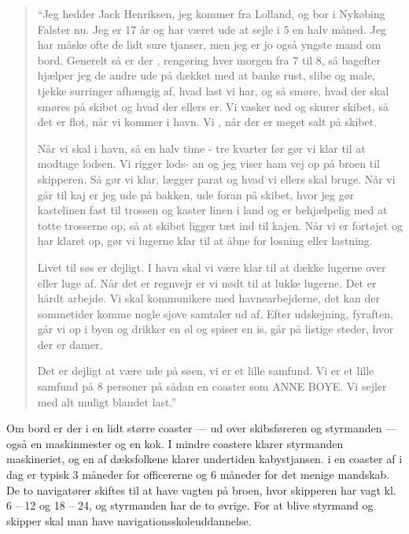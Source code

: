 \begin{quote}
    ``Jeg hedder Jack Henriksen, jeg kommer fra Lolland, og bor i Nykøbing
    Falster nu. Jeg er 17 år og har været ude at sejle i 5 en halv måned.
    Jeg har måske ofte de lidt sure tjanser, men jeg er jo også yngste
    mand om bord.  Generelt så er der , rengøring hver morgen fra 7 til 8, så
    bagefter hjælper jeg de andre ude på dækket med at banke rust, slibe
    og male, tjekke surringer afhængig af, hvad last vi har, og så smøre,
    hvad der skal smøres på skibet og hvad der ellers er. Vi vasker ned og
    skurer skibet, så det er flot, når vi kommer i havn. Vi , når der er
    meget salt på skibet. 
    
    Når vi skal i havn, så en halv time - tre kvarter før gør vi klar til
    at modtage lodsen. Vi rigger lods- an og jeg viser ham vej op på broen til skipperen. Så gør vi
    klar, lægger  parat og hvad vi ellers skal bruge. Når vi går til kaj er jeg
    ude på bakken, ude foran på skibet, hvor jeg gør kastelinen fast til
    trossen og kaster linen i land og er behjælpelig med at totte
    trosserne op, så at skibet ligger tæt ind til kajen. Når vi er
    fortøjet og har klaret op, gør vi lugerne klar til at åbne for losning
    eller lastning.
    
    Livet til søs er dejligt. I havn skal vi være klar til at dække
    lugerne over eller luge af. Når det er regnvejr er vi nødt til at
    lukke lugerne.  Det er hårdt arbejde. Vi skal kommunikere med
    havnearbejderne, det kan der sommetider komme nogle sjove samtaler ud
    af. Efter udskejning, fyraften, går vi op i byen og drikker en øl og
    spiser en is, går på listige steder, hvor der er damer. 
    
    Det er dejligt at være ude på søen, vi er et lille samfund. Vi er et
    lille samfund på 8 personer på sådan en coaster som ANNE BOYE. Vi
    sejler med alt muligt blandet last.'' 
\end{quote}


Om bord er der i en lidt større coaster --- ud over skibsføreren og
styrmanden --- også en maskinmester og en kok. I mindre coastere klarer
styrmanden maskineriet, og en af dæksfolkene klarer undertiden
kabystjansen.  i en coaster af i dag er typisk 3 måneder for
officererne og 6 måneder for det menige mandskab. De to navigatører
skiftes til at have vagten på broen, hvor skipperen har vagt kl. 6 -- 12
og 18 -- 24, og styrmanden har de to øvrige. For at blive styrmand og
skipper skal man have navigationsskoleuddannelse.
